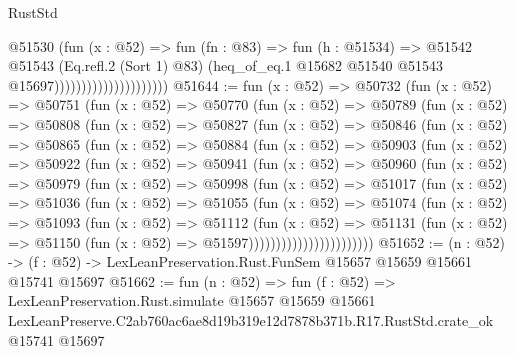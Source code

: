 \begin{lexlean}{RustStd}
\begin{coremodule}
                                        @51530
                                          (fun (x : @52) =>
                                          fun (fn : @83) =>
                                          fun (h : @51534) =>
                                          @51542
                                            @51543
                                            (Eq.refl.{2} (Sort 1) @83)
                                            (heq_of_eq.{1}
                                              @15682
                                              @51540
                                              @51543
                                              @15697)))))))))))))))))))))
@51644 := fun (x : @52) =>
  @50732
    (fun (x : @52) =>
    @50751
      (fun (x : @52) =>
      @50770
        (fun (x : @52) =>
        @50789
          (fun (x : @52) =>
          @50808
            (fun (x : @52) =>
            @50827
              (fun (x : @52) =>
              @50846
                (fun (x : @52) =>
                @50865
                  (fun (x : @52) =>
                  @50884
                    (fun (x : @52) =>
                    @50903
                      (fun (x : @52) =>
                      @50922
                        (fun (x : @52) =>
                        @50941
                          (fun (x : @52) =>
                          @50960
                            (fun (x : @52) =>
                            @50979
                              (fun (x : @52) =>
                              @50998
                                (fun (x : @52) =>
                                @51017
                                  (fun (x : @52) =>
                                  @51036
                                    (fun (x : @52) =>
                                    @51055
                                      (fun (x : @52) =>
                                      @51074
                                        (fun (x : @52) =>
                                        @51093
                                          (fun (x : @52) =>
                                          @51112
                                            (fun (x : @52) =>
                                            @51131
                                              (fun (x : @52) =>
                                              @51150 (fun (x : @52) => @51597)))))))))))))))))))))))
@51652 := (n : @52) ->
  (f : @52) -> LexLeanPreservation.Rust.FunSem @15657 @15659 @15661 @15741 @15697
@51662 := fun (n : @52) =>
  fun (f : @52) =>
  LexLeanPreservation.Rust.simulate
    @15657
    @15659
    @15661
    LexLeanPreserve.C2ab760ac6ae8d19b319e12d7878b371b.R17.RustStd.crate_ok
    @15741
    @15697
\end{coremodule}
\end{lexlean}
